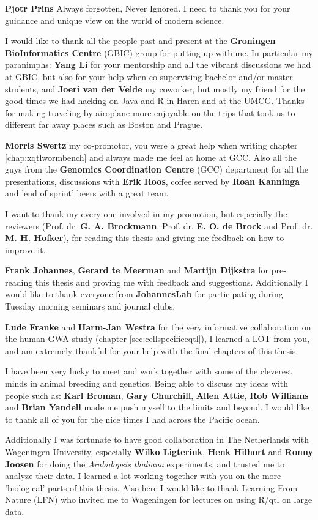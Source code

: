 {\bf Pjotr Prins} Always forgotten, Never Ignored. I need to thank you for your guidance and 
unique view on the world of modern science.

I would like to thank all the people past and present at the {\bf Groningen BioInformatics Centre} 
(GBIC) group for putting up with me. In particular my paranimphs: 
{\bf Yang Li} for your mentorship and all the vibrant discussions we had at GBIC, but also for 
your help when co-supervising bachelor and/or master students, and 
{\bf Joeri van der Velde}  my coworker, but mostly my friend for the good times we had hacking on 
Java and R in Haren and at the UMCG. Thanks for making traveling by airoplane more enjoyable on 
the trips that took us to different far away places such as Boston and Prague.

{\bf Morris Swertz} my co-promotor, you were a great help when writing chapter \ref{chap:xqtlwormbench} 
and always made me feel at home at GCC. Also all the guys from the {\bf Genomics Coordination 
Centre} (GCC) department for all the presentations, discussions with {\bf Erik Roos}, coffee 
served by {\bf Roan Kanninga} and 'end of sprint' beers with a great team.

I want to thank my every one involved in my promotion, but especially the reviewers (Prof. dr. 
{\bf G. A. Brockmann}, Prof. dr. {\bf E. O. de Brock} and Prof. dr. {\bf M. H. Hofker}), for 
reading this thesis and giving me feedback on how to improve it.
 
{\bf Frank Johannes}, {\bf Gerard te Meerman} and {\bf Martijn Dijkstra} for pre-reading this 
thesis and proving me with feedback and suggestions. Additionally I would like to thank everyone 
from {\bf JohannesLab} for participating during Tuesday morning seminars and journal clubs. 

{\bf Lude Franke} and {\bf Harm-Jan Westra} for the very informative collaboration on the 
human GWA study (chapter \ref{sec:cellspecificeqtl}), I learned a LOT from you, and am 
extremely thankful for your help with the final chapters of this thesis. 

I have been very lucky to meet and work together with some of the cleverest minds in animal breeding 
and genetics. Being able to discuss my ideas with people such as: {\bf Karl Broman}, {\bf Gary Churchill}, 
{\bf Allen Attie}, {\bf Rob Williams} and {\bf Brian Yandell} made me push myself to the limits 
and beyond. I would like to thank all of you for the nice times I had across the Pacific ocean.
 
Additionally I was fortunate to have good collaboration in The Netherlands with Wageningen University, 
especially {\bf Wilko Ligterink}, {\bf Henk Hilhort} and {\bf Ronny Joosen} for doing the 
\emph{Arabidopsis thaliana} experiments, and trusted me to analyze their data. I learned a lot working 
together with you on the more 'biological' parts of this thesis. Also here I would like to thank Learning 
From Nature (LFN) who invited me to Wageningen for lectures on using R/qtl on large data.

